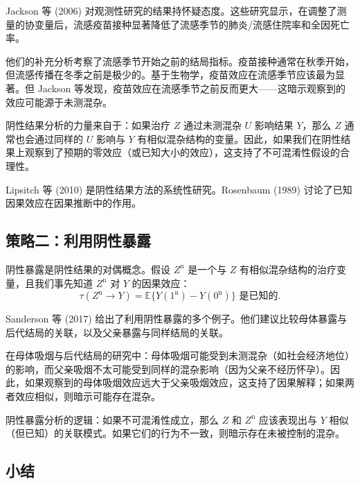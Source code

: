 \begin{Example}\label{ex:16-jackson}
Jackson 等 (2006) 对观测性研究的结果持怀疑态度。这些研究显示，在调整了测量的协变量后，流感疫苗接种显著降低了流感季节的肺炎/流感住院率和全因死亡率。

他们的补充分析考察了流感季节开始之前的结局指标。疫苗接种通常在秋季开始，但流感传播在冬季之前是极少的。基于生物学，疫苗效应在流感季节应该最为显著。但 Jackson 等发现，疫苗效应在流感季节之前反而更大——这暗示观察到的效应可能源于未测混杂。
\end{Example}

阴性结果分析的力量来自于：如果治疗 $Z$ 通过未测混杂 $U$ 影响结果 $Y$，那么 $Z$ 通常也会通过同样的 $U$ 影响与 $Y$ 有相似混杂结构的变量。因此，如果我们在阴性结果上观察到了预期的零效应（或已知大小的效应），这支持了不可混淆性假设的合理性。

Lipsitch 等 (2010) 是阴性结果方法的系统性研究。Rosenbaum (1989) 讨论了已知因果效应在因果推断中的作用。

\subsection{策略二：利用阴性暴露}\label{sec:16-negative-exposures}

阴性暴露是阴性结果的对偶概念。假设 $Z^{\mathrm{n}}$ 是一个与 $Z$ 有相似混杂结构的治疗变量，且我们事先知道 $Z^{\mathrm{n}}$ 对 $Y$ 的因果效应：
\[
\tau(Z^{\mathrm{n}} \to Y) = \mathbb{E}\{Y(1^{\mathrm{n}}) - Y(0^{\mathrm{n}})\} \text{ 是已知的}.
\label{eq:16-negative-exposure-effect}
\tag{16.7}
\]

\begin{Example}\label{ex:16-sanderson}
Sanderson 等 (2017) 给出了利用阴性暴露的多个例子。他们建议比较母体暴露与后代结局的关联，以及父亲暴露与同样结局的关联。

在母体吸烟与后代结局的研究中：母体吸烟可能受到未测混杂（如社会经济地位）的影响，而父亲吸烟不太可能受到同样的混杂影响（因为父亲不经历怀孕）。因此，如果观察到的母体吸烟效应远大于父亲吸烟效应，这支持了因果解释；如果两者效应相似，则暗示可能存在混杂。
\end{Example}

阴性暴露分析的逻辑：如果不可混淆性成立，那么 $Z$ 和 $Z^{\mathrm{n}}$ 应该表现出与 $Y$ 相似（但已知）的关联模式。如果它们的行为不一致，则暗示存在未被控制的混杂。

\subsection{小结}\label{sec:16-assessment-summary}

